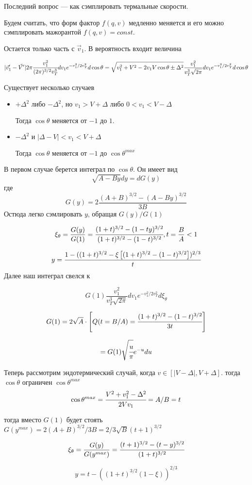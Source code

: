 Последний вопрос --- как сэмплировать термальные скорости.

Будем считать, что форм фактор $f(q,v)$ медленно меняется и его можно сэмплировать мажорантой $f(q,v) = const$.

Остается только часть с $\vec{v}_1$. В вероятность входит величина 

$$
|\vec{v}_1' - \vec{V}'| 2\pi \cfrac{v_1^2}{(2\pi)^{3/2} v_T^3} dv_1 e^{-v_1^2/2v_T^2} d\cos{\theta} = \sqrt{ v_1^2 + V^2 - 2 v_1 V \cos{\theta} \pm \Delta^2 } \frac{ v_1^2}{v_T^3 \sqrt{2\pi}} dv_1 e^{-v_1^2/2v_T^2} d\cos{\theta}
$$

Существует несколько случаев
\begin{itemize}
	\item $+\Delta^2$ либо $-\Delta^2$, но $v_1 > V+\Delta$ либо $0 < v_1 < V-\Delta$
	
	Тогда $\cos{\theta}$ меняется от $-1$ до $1$. 
	
	\item $-\Delta^2$ и $|\Delta - V| < v_1 < V+\Delta$
	
	Тогда  $\cos{\theta}$ меняется от $-1$ до $\cos{\theta}^{max}$
\end{itemize}

В первом случае берется интеграл по $\cos{\theta}$. Он имеет вид
$$
	\sqrt{A - B y} dy = dG(y) 	
$$
где 
$$
	G(y) = 2\frac{(A+B)^{3/2} - (A-By)^{3/2}}{3B}
$$
Остюда легко сэмлировать $y$, обращая $G(y)/G(1)$

$$
\xi_{\theta} = \frac{G(y)}{G(1)} = \cfrac{(1+t)^{3/2} - (1-t y)^{3/2}} {(1+t)^{3/2} - (1-t )^{3/2}}, t = \frac{B}{A} < 1
$$

$$
	y = \cfrac{1 - ( (1+t)^{3/2} - \xi \left[ (1+t)^{3/2}-(1-t)^{3/2}\right] )^{2/3} }{t}
$$
Далее наш интеграл свелся к 

$$
G(1) \frac{ v_1^2}{v_T^3\sqrt{2\pi}} dv_1 e^{-v_1^2/2v_T^2} d\xi_{\theta}
$$

$$G(1) =2 \sqrt{A} \cdot \left[ Q(t=B/A) = \cfrac{(1 + t)^{3/2} - (1 - t)^{3/2}}{3t} \right]$$

$$
 = G(1) \sqrt{\cfrac{u}{\pi}} e^{-u}du
$$

Теперь рассмотрим эндотермический случай, когда $v \in [|V-\Delta|, V+\Delta]$.
тогда $\cos{\theta}$ ограничен $\cos{\theta}^{max}$
$$
	\cos{\theta}^{max} = \cfrac{V^2+v_1^2-\Delta^2}{2 V v_1} = A/B = t
$$

тогда вместо $G(1)$ будет стоять $G(y^{max}) = 2 (A+B)^{3/2}/3B = 2/3\sqrt{B} (t+1)^{3/2}$ 

$$
\xi_{\theta} = \frac{G(y)}{G(y^{max})} = \cfrac{(t+1)^{3/2} - (t - y)^{3/2}} {(1+t)^{3/2}}
$$

$$
	y = t - \left( (1+t)^{3/2} (1-\xi) \right)^{2/3}
$$
